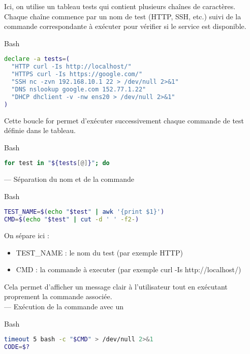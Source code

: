 \documentclass{article}
\begin{document}
Ici, on utilise un tableau tests qui contient plusieurs chaînes de caractères. Chaque chaîne commence par un nom de test (HTTP, SSH, etc.) suivi de la commande correspondante à exécuter pour vérifier si le service est disponible.

\begin{codebox}{Bash}
\begin{lstlisting}[language=Bash]
declare -a tests=(
  "HTTP curl -Is http://localhost/"
  "HTTPS curl -Is https://google.com/"
  "SSH nc -zvn 192.168.10.1 22 > /dev/null 2>&1"
  "DNS nslookup google.com 152.77.1.22"
  "DHCP dhclient -v -nw ens20 > /dev/null 2>&1"
)
\end{lstlisting}
\end{codebox}

Cette boucle for permet d’exécuter successivement chaque commande de test définie dans le tableau.

\begin{codebox}{Bash}
\begin{lstlisting}[language=Bash]
for test in "${tests[@]}"; do
\end{lstlisting}
\end{codebox}

---
Séparation du nom et de la commande

\begin{codebox}{Bash}
\begin{lstlisting}[language=Bash]
TEST_NAME=$(echo "$test" | awk '{print $1}')
CMD=$(echo "$test" | cut -d ' ' -f2-)
\end{lstlisting}
\end{codebox}


On sépare ici :
\begin{itemize}
\item TEST\_NAME : le nom du test (par exemple HTTP)
\item CMD : la commande à executer (par exemple curl -Is http://localhost/)
\end{itemize}


Cela permet d’afficher un message clair à l’utilisateur tout en exécutant proprement la commande associée.\\


---
Exécution de la commande avec un 

\begin{codebox}{Bash}
\begin{lstlisting}[language=Bash]
timeout 5 bash -c "$CMD" > /dev/null 2>&1
CODE=$?
\end{lstlisting}
\end{codebox}
\end{document}

